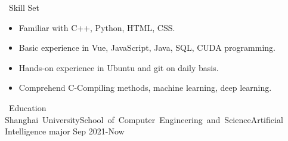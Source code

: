 \documentclass[UTF8]{resume}
\begin{document}
  
\begin{rSection}{\faCogs~Skill Set}
    \begin{itemize}
        \itemsep -0.5em
        \item Familiar with C++, Python, HTML, CSS.
        \item Basic experience in Vue, JavaScript, Java, SQL, CUDA programming.
        \item Hands-on experience in Ubuntu and git on daily basis.
        \item Comprehend C-Compiling methods, machine learning, deep learning.
    \end{itemize} 
\end{rSection}

\begin{rSection}{\faGraduationCap~Education}
    Shanghai~University\quad School~of~Computer~Engineering~and~Science\quad Artificial Intelligence major \hfill Sep 2021-Now\\
\end{rSection}
 
\end{document}
